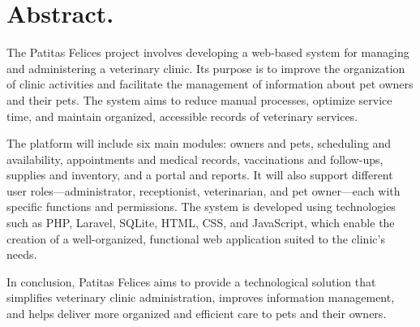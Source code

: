 \section*{Abstract.}

The Patitas Felices project involves developing a web-based system for managing and administering a veterinary clinic. Its purpose is to improve the organization of clinic activities and facilitate the management of information about pet owners and their pets. The system aims to reduce manual processes, optimize service time, and maintain organized, accessible records of veterinary services.

The platform will include six main modules: owners and pets, scheduling and availability, appointments and medical records, vaccinations and follow-ups, supplies and inventory, and a portal and reports. It will also support different user roles—administrator, receptionist, veterinarian, and pet owner—each with specific functions and permissions. The system is developed using technologies such as PHP, Laravel, SQLite, HTML, CSS, and JavaScript, which enable the creation of a well-organized, functional web application suited to the clinic's needs.

In conclusion, Patitas Felices aims to provide a technological solution that simplifies veterinary clinic administration, improves information management, and helps deliver more organized and efficient care to pets and their owners.

